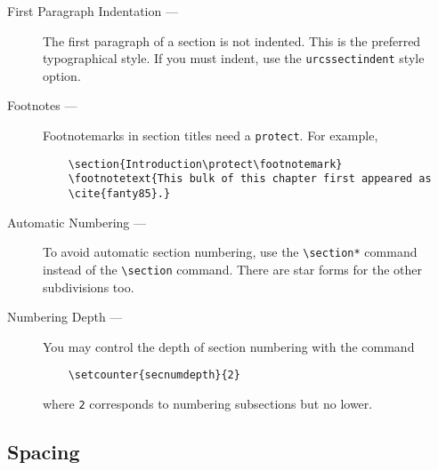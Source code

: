 \begin{description}

\item[First Paragraph Indentation ---]
The first paragraph of a section is not indented.
This is the preferred typographical style.
If you must indent, use the \verb|urcssectindent| style option.

\item[Footnotes ---]
Footnotemarks in section titles need a \verb|protect|.
For example,
\begin{verbatim}
    \section{Introduction\protect\footnotemark}
    \footnotetext{This bulk of this chapter first appeared as
    \cite{fanty85}.}
\end{verbatim}

\item[Automatic Numbering ---]
To avoid automatic section numbering,
use the \verb|\section*| command instead of the \verb|\section| command.
There are star forms for the other subdivisions too.

\item[Numbering Depth ---]
You may control the depth of section numbering with the command
\begin{verbatim}
    \setcounter{secnumdepth}{2}
\end{verbatim}

where {\tt 2} corresponds to numbering subsections
but no lower.

\end{description}

\subsection{Spacing}


